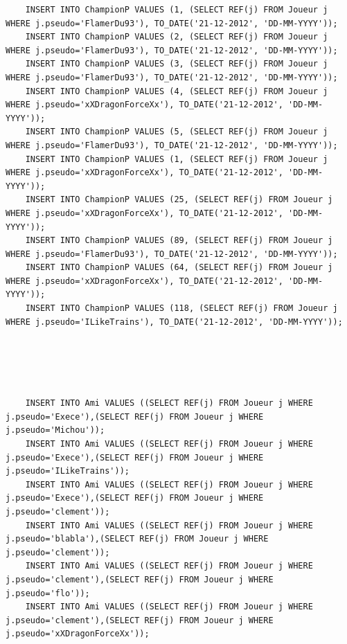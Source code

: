 \documentclass[a4paper,10pt]{report}
\begin{document}
\begin{lstlisting}
    INSERT INTO ChampionP VALUES (1, (SELECT REF(j) FROM Joueur j WHERE j.pseudo='FlamerDu93'), TO_DATE('21-12-2012', 'DD-MM-YYYY'));
    INSERT INTO ChampionP VALUES (2, (SELECT REF(j) FROM Joueur j WHERE j.pseudo='FlamerDu93'), TO_DATE('21-12-2012', 'DD-MM-YYYY'));
    INSERT INTO ChampionP VALUES (3, (SELECT REF(j) FROM Joueur j WHERE j.pseudo='FlamerDu93'), TO_DATE('21-12-2012', 'DD-MM-YYYY'));
    INSERT INTO ChampionP VALUES (4, (SELECT REF(j) FROM Joueur j WHERE j.pseudo='xXDragonForceXx'), TO_DATE('21-12-2012', 'DD-MM-YYYY'));
    INSERT INTO ChampionP VALUES (5, (SELECT REF(j) FROM Joueur j WHERE j.pseudo='FlamerDu93'), TO_DATE('21-12-2012', 'DD-MM-YYYY'));
    INSERT INTO ChampionP VALUES (1, (SELECT REF(j) FROM Joueur j WHERE j.pseudo='xXDragonForceXx'), TO_DATE('21-12-2012', 'DD-MM-YYYY'));
    INSERT INTO ChampionP VALUES (25, (SELECT REF(j) FROM Joueur j WHERE j.pseudo='xXDragonForceXx'), TO_DATE('21-12-2012', 'DD-MM-YYYY'));
    INSERT INTO ChampionP VALUES (89, (SELECT REF(j) FROM Joueur j WHERE j.pseudo='FlamerDu93'), TO_DATE('21-12-2012', 'DD-MM-YYYY'));
    INSERT INTO ChampionP VALUES (64, (SELECT REF(j) FROM Joueur j WHERE j.pseudo='xXDragonForceXx'), TO_DATE('21-12-2012', 'DD-MM-YYYY'));
    INSERT INTO ChampionP VALUES (118, (SELECT REF(j) FROM Joueur j WHERE j.pseudo='ILikeTrains'), TO_DATE('21-12-2012', 'DD-MM-YYYY'));





    INSERT INTO Ami VALUES ((SELECT REF(j) FROM Joueur j WHERE j.pseudo='Exece'),(SELECT REF(j) FROM Joueur j WHERE j.pseudo='Michou'));
    INSERT INTO Ami VALUES ((SELECT REF(j) FROM Joueur j WHERE j.pseudo='Exece'),(SELECT REF(j) FROM Joueur j WHERE j.pseudo='ILikeTrains'));
    INSERT INTO Ami VALUES ((SELECT REF(j) FROM Joueur j WHERE j.pseudo='Exece'),(SELECT REF(j) FROM Joueur j WHERE j.pseudo='clement'));
    INSERT INTO Ami VALUES ((SELECT REF(j) FROM Joueur j WHERE j.pseudo='blabla'),(SELECT REF(j) FROM Joueur j WHERE j.pseudo='clement'));
    INSERT INTO Ami VALUES ((SELECT REF(j) FROM Joueur j WHERE j.pseudo='clement'),(SELECT REF(j) FROM Joueur j WHERE j.pseudo='flo'));
    INSERT INTO Ami VALUES ((SELECT REF(j) FROM Joueur j WHERE j.pseudo='clement'),(SELECT REF(j) FROM Joueur j WHERE j.pseudo='xXDragonForceXx'));




\end{lstlisting}
\end{document}
